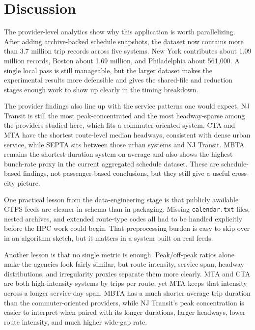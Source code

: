 \documentclass[sigconf,nonacm]{acmart}
\begin{document}
\section{Discussion}
The provider-level analytics show why this application is worth parallelizing. After adding archive-backed schedule snapshots, the dataset now contains more than 3.7 million trip records across five systems. New York contributes about 1.09 million records, Boston about 1.69 million, and Philadelphia about 561,000. A single local pass is still manageable, but the larger dataset makes the experimental results more defensible and gives the shared-file and reduction stages enough work to show up clearly in the timing breakdown.

The provider findings also line up with the service patterns one would expect. NJ Transit is still the most peak-concentrated and the most headway-sparse among the providers studied here, which fits a commuter-oriented system. CTA and MTA have the shortest route-level median headways, consistent with dense urban service, while SEPTA sits between those urban systems and NJ Transit. MBTA remains the shortest-duration system on average and also shows the highest bunch-rate proxy in the current aggregated schedule dataset. These are schedule-based findings, not passenger-based conclusions, but they still give a useful cross-city picture.

One practical lesson from the data-engineering stage is that publicly available GTFS feeds are cleaner in schema than in packaging. Missing \texttt{calendar.txt} files, nested archives, and extended route-type codes all had to be handled explicitly before the HPC work could begin. That preprocessing burden is easy to skip over in an algorithm sketch, but it matters in a system built on real feeds.

Another lesson is that no single metric is enough. Peak/off-peak ratios alone make the agencies look fairly similar, but route intensity, service span, headway distributions, and irregularity proxies separate them more clearly. MTA and CTA are both high-intensity systems by trips per route, yet MTA keeps that intensity across a longer service-day span. MBTA has a much shorter average trip duration than the commuter-oriented providers, while NJ Transit's peak concentration is easier to interpret when paired with its longer durations, larger headways, lower route intensity, and much higher wide-gap rate.
\end{document}
